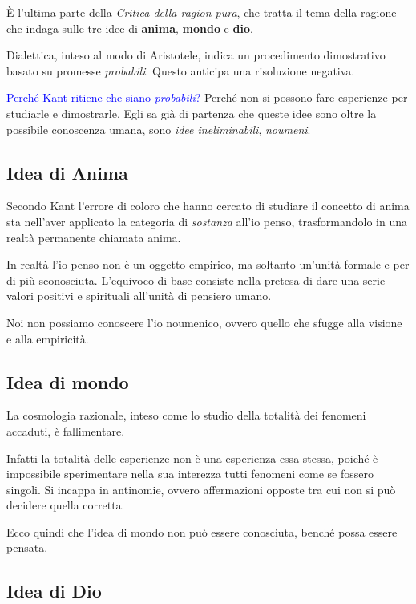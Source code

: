 \documentclass[a4paper, twoside, titlepage]{book}
\renewcommand{\emph}[1]{\textcolor{blue}{#1}}
\begin{document}
È l’ultima parte della \textit{Critica della ragion pura}, che tratta il tema della ragione che indaga sulle tre idee di \textbf{anima}, \textbf{mondo} e \textbf{dio}.

Dialettica, inteso al modo di Aristotele, indica un procedimento dimostrativo basato su promesse \textit{probabili}. Questo anticipa una risoluzione negativa.

\emph{Perché Kant ritiene che siano \textit{probabili}?} 
Perché non si possono fare esperienze per studiarle e dimostrarle. Egli sa già di partenza che queste idee sono oltre la possibile conoscenza umana, sono \textit{idee ineliminabili}, \textit{noumeni}.

\subsection{Idea di Anima}

Secondo Kant l’errore di coloro che hanno cercato di studiare il concetto di anima sta nell’aver applicato la categoria di \textit{sostanza} all’io penso, trasformandolo in una realtà permanente chiamata anima.

In realtà l’io penso non è un oggetto empirico, ma soltanto un’unità formale e per di più sconosciuta.
L’equivoco di base consiste nella pretesa di dare una serie valori positivi e spirituali all’unità di pensiero umano.

 Noi non possiamo conoscere l’io noumenico, ovvero quello che sfugge alla visione e alla empiricità.

\subsection{Idea di mondo}

La cosmologia razionale, inteso come lo studio della totalità dei fenomeni accaduti, è fallimentare.

Infatti la totalità delle esperienze non è una esperienza essa stessa, poiché è impossibile sperimentare nella sua interezza tutti fenomeni come se fossero singoli. Si incappa in antinomie, ovvero affermazioni opposte tra cui non si può decidere quella corretta.

Ecco quindi che l’idea di mondo non può essere conosciuta, benché possa essere pensata.

\subsection{Idea di Dio}
\end{document}
